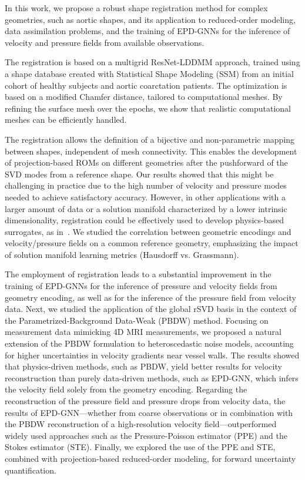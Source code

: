 In this work, we propose a robust shape registration method for complex geometries, such as aortic shapes, and its application to reduced-order modeling, data assimilation problems, and the training of EPD-GNNs for the inference of velocity and pressure fields from available observations.

The registration is based on a multigrid ResNet-LDDMM approach, trained using a shape database created with Statistical Shape Modeling (SSM) from an initial cohort of healthy subjects and aortic coarctation patients. The optimization is based on a modified Chamfer distance, tailored to computational meshes. By refining the surface mesh over the epochs, we show that realistic computational meshes can be efficiently handled.

The registration allows the definition of a bijective and non-parametric mapping between shapes, independent of mesh connectivity.
This enables the development of projection-based ROMs on different geometries after the pushforward of the SVD modes from a reference shape.
Our results showed that this might be challenging in practice due to the high number of velocity and pressure modes needed to achieve satisfactory accuracy.
However, in other applications with a larger amount of data or a solution manifold characterized by a lower intrinsic dimensionality, registration could be effectively used to develop physics-based surrogates, as in~\cite{guibert2014group}. 
We studied the correlation between geometric encodings and velocity/pressure fields on a common reference geometry,
emphasizing the impact of solution manifold learning metrics (Hausdorff vs. Grassmann). 

The employment of registration leads to a substantial improvement in the training of EPD-GNNs for the inference of pressure and velocity fields from geometry encoding, as well as for the inference of the pressure field from velocity data.
%
Next, we studied the application of the global rSVD basis in the context of the Parametrized-Background Data-Weak (PBDW) method.
Focusing on measurement data mimicking 4D MRI measurements, we proposed a natural extension of the PBDW formulation to heteroscedastic noise models, accounting for higher uncertainties in velocity gradients near vessel walls.
%
The results showed that physics-driven methods, such as PBDW, yield better results for velocity reconstruction than purely data-driven methods, such as EPD-GNN, which infers the velocity field solely from the geometry encoding.
%
Regarding the reconstruction of the pressure field and pressure drops from velocity data, the results of EPD-GNN—whether from coarse observations or in combination with the PBDW reconstruction of a high-resolution velocity field—outperformed widely used approaches such as the Pressure-Poisson estimator (PPE) and the Stokes estimator (STE).
%
Finally, we explored the use of the PPE and STE, combined with projection-based reduced-order modeling, for forward uncertainty quantification.

